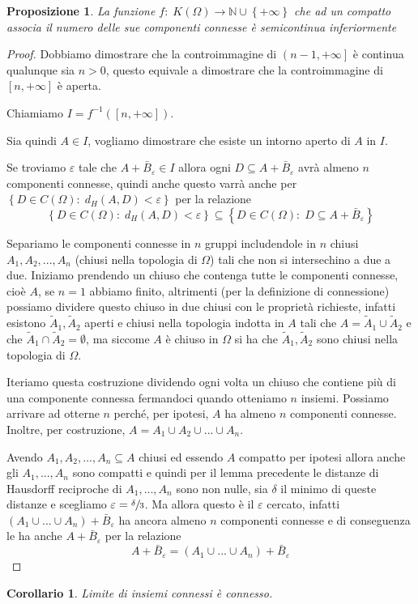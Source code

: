 \documentclass[a4paper,10pt]{article}
\newcounter{counter1}
\theoremstyle{plain}
\newtheorem{mypro}[counter1]{Proposizione}
\newtheorem{mycor}[counter1]{Corollario}
\theoremstyle{definition}
\theoremstyle{remark}
\newcommand{\set}[1]{\left\{#1\right\}}
\newcommand{\pa}[1]{\left(#1\right)}
\newcommand{\bra}[1]{\left[#1\right]}
\begin{document}
\begin{mypro}
  La funzione $f:\; K(\Omega) \rightarrow \mathbb{N} \cup \set{+\infty}$
  che ad un compatto associa il numero delle sue componenti connesse è
  semicontinua inferiormente
\end{mypro}
\begin{proof}
  Dobbiamo dimostrare che la controimmagine di $\left(n-1,
    +\infty\right]$ è continua qualunque sia $n>0$, questo equivale a
  dimostrare che la controimmagine di $\bra{n,+\infty}$ è aperta.

  Chiamiamo $I = f^{-1}\pa{\bra{n,+\infty}}$.

  Sia quindi $A \in I$, vogliamo dimostrare che esiste un intorno
  aperto di $A$ in $I$.

  Se troviamo $\varepsilon$ tale che $A + \bar B_{\varepsilon} \in I$
  allora ogni $D \subseteq A + \bar B_{\varepsilon}$ avrà almeno $n$
  componenti connesse, quindi anche questo varrà anche per $\set{D \in
    C(\Omega):\; d_H(A,D) < \varepsilon}$ per la relazione
  \[ \set{D \in C(\Omega):\; d_H(A,D) < \varepsilon} \subseteq \set{D
    \in C(\Omega):\; D \subseteq A + \bar B_{\varepsilon}} \]

  Separiamo le componenti connesse in $n$ gruppi includendole in $n$
  chiusi $A_1,A_2,...,A_n$ (chiusi nella topologia di $\Omega$) tali
  che non si intersechino a due a due. Iniziamo prendendo un chiuso
  che contenga tutte le componenti connesse, cioè $A$, se $n=1$
  abbiamo finito, altrimenti (per la definizione di connessione)
  possiamo dividere questo chiuso in due chiusi con le proprietà
  richieste, infatti esistono $\tilde A_1, \tilde A_2$ aperti e chiusi
  nella topologia indotta in $A$ tali che $A = \tilde A_1 \cup \tilde
  A_2$ e che $\tilde A_1 \cap \tilde A_2 = \emptyset$, ma siccome $A$
  è chiuso in $\Omega$ si ha che $\tilde A_1, \tilde A_2$ sono chiusi
  nella topologia di $\Omega$.

  Iteriamo questa costruzione dividendo ogni volta un chiuso che
  contiene più di una componente connessa fermandoci quando otteniamo
  $n$ insiemi. Possiamo arrivare ad otterne $n$ perché, per ipotesi,
  $A$ ha almeno $n$ componenti connesse. Inoltre, per costruzione, $A
  = A_1 \cup A_2 \cup ... \cup A_n$.

  Avendo $A_1,A_2,..., A_n \subseteq A$ chiusi ed essendo $A$ compatto
  per ipotesi allora anche gli $A_1, ..., A_n$ sono compatti e quindi
  per il lemma precedente le distanze di Hausdorff reciproche di $A_1,
  ..., A_n$ sono non nulle, sia $\delta$ il minimo di queste distanze
  e scegliamo $\varepsilon = \sfrac{\delta}{3}$. Ma allora questo è il
  $\varepsilon$ cercato, infatti $\pa{A_1\cup ... \cup A_n} + \bar B
  _\varepsilon$ ha ancora almeno $n$ componenti connesse e di
  conseguenza le ha anche $A + \bar B_{\varepsilon}$ per la relazione
  \[ A + \bar B_{\varepsilon} = \pa{A_1\cup ... \cup A_n} + \bar
  B_\varepsilon\]
\end{proof}
\begin{mycor}
  Limite di insiemi connessi è connesso.
\end{mycor}
\end{document}
